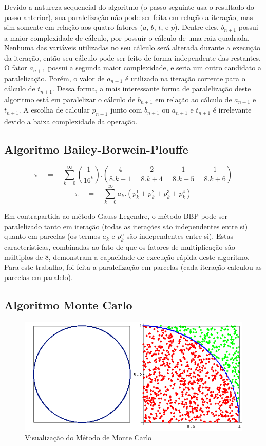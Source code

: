 \documentclass[12pt]{article}
\begin{document}
Devido a natureza sequencial do algoritmo (o passo seguinte usa o resultado do passo anterior),
sua paralelização não pode ser feita em relação a iteração, mas sim somente em relação aos quatro
fatores ($a$, $b$, $t$, e $p$). Dentre eles, $b_{n+1}$ possui a maior complexidade de cálculo,
por possuir o cálculo de uma raiz quadrada. Nenhuma das variáveis utilizadas no seu cálculo
será alterada durante a execução da iteração, então seu cálculo pode ser feito de forma
independente das restantes. O fator $a_{n+1}$ possui a segunda maior complexidade, e seria um
outro candidato a paralelização. Porém, o valor de $a_{n+1}$ é utilizado na iteração corrente
para o cálculo de $t_{n+1}$. Dessa forma, a mais interessante forma de paralelização deste
algoritmo está em paralelizar o cálculo de $b_{n+1}$ em relação ao cálculo de
$a_{n+1}$ e $t_{n+1}$. A escolha de calcular $p_{n+1}$ junto com $b_{n+1}$ ou
$a_{n+1}$ e $t_{n+1}$ é irrelevante devido a baixa complexidade da operação.

\subsection{Algoritmo Bailey-Borwein-Plouffe}

\begin{equation}
	\pi \quad = \quad \sum_{k=0}^{\infty}\left(\frac{1}{16^k}\right).
	\left(
		\frac{4}{8.k + 1} - \frac{2}{8.k + 4} - \frac{1}{8.k + 5} - \frac{1}{8.k + 6}
	\right)
\end{equation}
\begin{equation}
	\pi \quad = \quad \sum_{k=0}^{\infty} a_k.
	\left(p^1_k + p^2_k + p^3_k + p^4_k\right)
\end{equation}

Em contrapartida ao método Gauss-Legendre, o método BBP pode ser paralelizado tanto em iteração
(todas as iterações são independentes entre si) quanto em parcelas (os termos $a_k$ e $p^n_k$
são independentes entre si). Estas características, combinadas ao fato de que os fatores de
multiplicação são múltiplos de 8, demonstram a capacidade de execução rápida deste algoritmo.
Para este trabalho, foi feita a paralelização em parcelas (cada iteração calculou as parcelas
em paralelo).

\subsection{Algoritmo Monte Carlo}

\begin{figure}[h]
	\centering
	\includegraphics[width=.8\textwidth]{fig01.png}
	\caption{Visualização do Método de Monte Carlo}
	\label{fig:MonteCarloFig01}
\end{figure}
	
\end{document}

